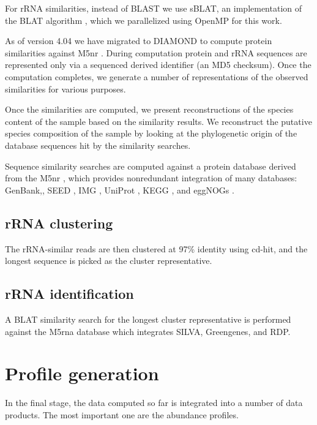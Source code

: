 \documentclass[12pt,fullpage]{report}
\begin{document}
For rRNA similarities, instead of BLAST we use sBLAT, an implementation of the BLAT algorithm \cite{BLAT}, which we parallelized using OpenMP \cite{OPENMP} for this work.

As of version 4.04 we have migrated to DIAMOND\cite{DIAMOND} to compute protein similarities against M5nr \cite{M5NR}. During computation protein and rRNA sequences are represented only via a sequenced derived identifier (an MD5 checksum). Once the computation completes, we generate a number of representations of the observed similarities for various purposes.


Once the similarities are computed, we present reconstructions of the species content of the sample based on the similarity results. We reconstruct the putative species composition of the sample by looking at the phylogenetic origin of the database sequences hit by the similarity searches.

 Sequence similarity searches are computed against a protein database derived from the M5nr \cite{M5NR}, which provides nonredundant integration of many databases: GenBank,\cite{GENBANK}, \gls{SEED} \cite{SUBSYSTEMS}, IMG \cite{IMG}, UniProt \cite{UNIPROT}, KEGG \cite{KEGG}, and eggNOGs \cite{EGGNOG}.





\subsection*{rRNA clustering}
The rRNA-similar reads are then clustered at 97\% identity using cd-hit, and the longest sequence is picked as the cluster representative.

\subsection*{rRNA identification}
 A BLAT similarity search for the longest cluster representative is performed against the M5rna database which integrates SILVA\cite{SILVA}, Greengenes\cite{GREENGENES}, and RDP\cite{RDP}.


\section{Profile generation}
In the final stage, the data computed so far is integrated into a number of data products. The most important one are the abundance profiles.
\end{document}
